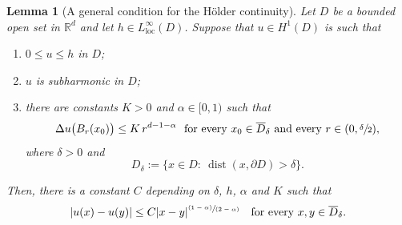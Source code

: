 \documentclass[11pt]{article}
\numberwithin{equation}{section}
\newenvironment{enumeratea}
{\bgroup\def\theenumi{\alph{enumi}}\begin{enumerate}}
{\end{enumerate}\egroup}
\newcommand{\pspfrac}[2]{\sfrac{(#1)}{(#2)}}
\newcommand{\loc}{\mathrm{loc}}
\DeclareMathOperator{\dist}{dist}
\theoremstyle{plain}
\newtheorem{lemma}[teo]{Lemma}
\theoremstyle{definition}
\def\R{\mathbb{R}}
\begin{document}
\begin{lemma}[A general condition for the Hölder continuity]\label{l:holder}
Let $D$ be a bounded open set in $\R^d$ and let $h\in L^\infty_{\loc}(D)$.
Suppose that $u\in H^1(D)$ is such that
\begin{enumeratea}
\item $0\le u\le h$ in $D$;
\item $u$ is subharmonic in $D$;
\item there are constants $K>0$ and $\alpha\in[0,1)$ such that
\begin{equation}\label{e:opt_cond_balls}
\Delta u\big(B_r(x_0)\big)\le K\,r^{d-1-\alpha}\ \text{ for every } x_0\in \overline D_\delta\text{ and every $r\in(0,\sfrac\delta2)$},
\end{equation}
where $\delta>0$ and
\begin{equation}\label{e:Ddelta}
D_\delta:=\big\{x\in D:\ \dist(x,\partial D)> \delta\big\}.
\end{equation}
\end{enumeratea}
Then, there is a constant $C$ depending on $\delta$, $h$, $\alpha$ and $K$ such that
\[|u(x)-u(y)|\le C|x-y|^{\pspfrac{1-\alpha}{2-\alpha}}\quad\text{for every } x,y\in \overline D_\delta.\]
\end{lemma}
\end{document}

